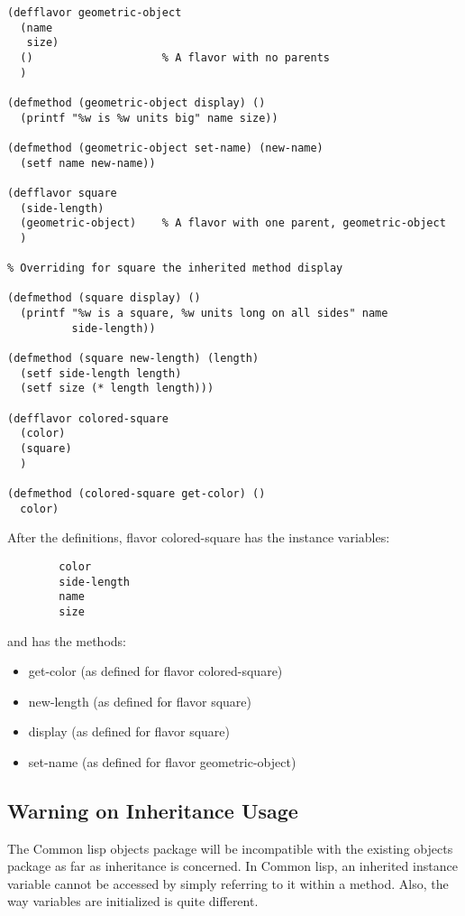 \begin{verbatim}
(defflavor geometric-object
  (name
   size)
  ()                    % A flavor with no parents
  )

(defmethod (geometric-object display) ()
  (printf "%w is %w units big" name size))

(defmethod (geometric-object set-name) (new-name)
  (setf name new-name))

(defflavor square
  (side-length)
  (geometric-object)    % A flavor with one parent, geometric-object
  )

% Overriding for square the inherited method display

(defmethod (square display) ()
  (printf "%w is a square, %w units long on all sides" name
          side-length))

(defmethod (square new-length) (length)
  (setf side-length length)
  (setf size (* length length)))

(defflavor colored-square
  (color)
  (square)
  )

(defmethod (colored-square get-color) ()
  color)
\end{verbatim}
After  the  definitions,  flavor colored-square has the instance
variables:

\begin{verbatim}
        color
        side-length
        name
        size
\end{verbatim}
and has the methods:
\begin {itemize}
\item   get-color (as defined for flavor colored-square)
\item        new-length (as defined for flavor square)
\item        display (as defined for flavor square)
\item        set-name (as defined for flavor geometric-object)
\end {itemize}

\subsection{Warning on Inheritance Usage}

  The Common lisp objects package will be incompatible with  the
existing objects package as far as inheritance is concerned.  In
Common  lisp,  an inherited instance variable cannot be accessed
by simply referring to  it  within  a  method.   Also,  the  way
variables are initialized is quite different.

